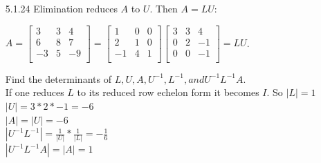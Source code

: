 \documentclass[10pt,twoside,reqno]{article}
\begin{document}
\begin{enumerate}
\item[5.1.24] Elimination reduces $A$ to $U$. Then $A = LU$: \\
\begin{center}
$
A=
\begin{bmatrix}
3&3&4\\
6&8&7\\
-3&5&-9\\
\end{bmatrix}
=
\begin{bmatrix}
1&0&0\\
2&1&0\\
-1&4&1\\
\end{bmatrix}
\begin{bmatrix}
3&3&4\\
0&2&-1\\
0&0&-1\\
\end{bmatrix}
=LU
$. \\
\end{center}
Find the determinants of $L,U,A,U^{-1},L^{-1}, and U^{-1}L^{-1}A$. \\
\vspace{2mm}
{\addtolength{\leftskip}{10mm}
If one reduces $L$ to its reduced row echelon form it becomes $I$. So $|L|=1$ \\ \vspace{2mm}
$|U|=3*2*-1=-6$ \\ \vspace{2mm}
$|A|=|U|=-6$ \\ \vspace{2mm}
$|U^{-1}L^{-1}|=\frac{1}{|U|}*\frac{1}{|L|}=-\frac{1}{6}$ \\ \vspace{2mm}
$|U^{-1}L^{-1}A|=|A|=1$ \\ \vspace{3mm}
}


\end{enumerate}
\end{document}
